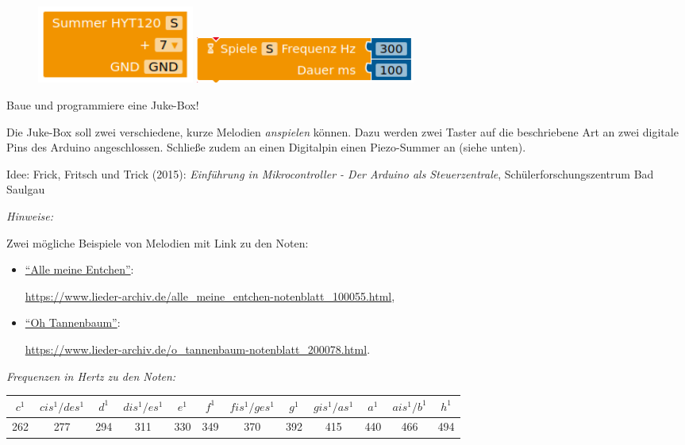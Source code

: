 \newpage
\begin{projekt}\label{proj:jukebox}
	\begin{figure}
		\centering
		\vspace{-\baselineskip}
		\includegraphics[width=0.25\textwidth]{pics/piezokonfiguration.png}
		\includegraphics[width=0.35\textwidth]{pics/piezo-steuerung.png}
		\vspace{-\baselineskip}
		\label{abb:piezo-steuerung}
	\end{figure}
	Baue und programmiere eine Juke-Box!
	
	Die Juke-Box soll zwei verschiedene, kurze Melodien \emph{anspielen} können. Dazu werden zwei Taster auf die beschriebene Art an zwei digitale Pins des Arduino angeschlossen. Schließe zudem an einen Digitalpin einen Piezo-Summer an (siehe unten). 
	
	{\scriptsize Idee: Frick, Fritsch und Trick (2015): \emph{Einführung in Mikrocontroller - Der Arduino als Steuerzentrale}, Schülerforschungszentrum Bad Saulgau}
\end{projekt}

\emph{Hinweise:}

Zwei mögliche Beispiele von Melodien mit Link zu den Noten:
\begin{itemize}[itemsep=0ex, parsep=0mm]
	\item \href{https://www.lieder-archiv.de/alle\_meine\_entchen-notenblatt\_100055.html}{\enquote{Alle meine Entchen}}:
	
	\url{https://www.lieder-archiv.de/alle\_meine\_entchen-notenblatt\_100055.html},
	\item  \href{https://www.lieder-archiv.de/o\_tannenbaum-notenblatt\_200078.html}{\enquote{Oh Tannenbaum}}:
	
	\url{https://www.lieder-archiv.de/o\_tannenbaum-notenblatt\_200078.html}.
\end{itemize}

\emph{Frequenzen in Hertz zu den Noten:}

\begin{tabular}{c|c|c|c|c|c|c|c|c|c|c|c}\footnotesize
	$c^1$ & $cis^1/des^1$ & $d^1$ & $dis^1/es^1$ & $e^1$ & $f^1$ & $fis^1/ges^1$ & $g^1$ & $gis^1/as^1$ &  $a^1$ & $ais^1/b^1$ & $h^1$\\
	\hline \footnotesize
	 262 & 277 & 294 & 311 & 330 & 349 & 370 & 392 & 415 & 440 & 466 & 494\\
\end{tabular}

